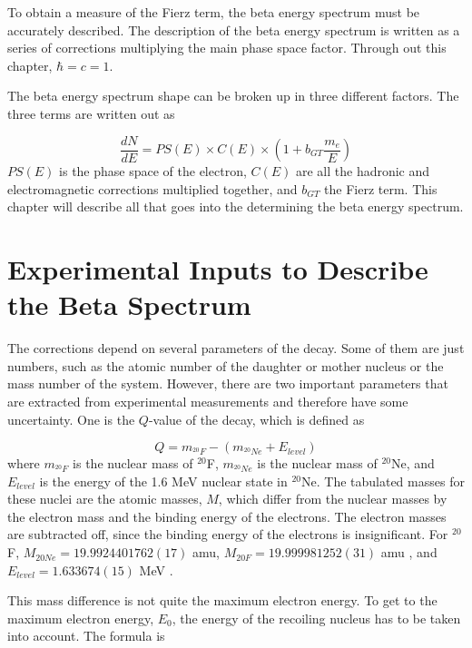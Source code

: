\documentclass[../MaxHughesThesis.tex]{subfiles}
\begin{document}
To obtain a measure of the Fierz term, the beta energy spectrum must be accurately described.
The description of the beta energy spectrum is written as a series of corrections multiplying the main phase space factor.  
Through out this chapter, $\hbar = c = 1$.

The beta energy spectrum shape can be broken up in three different factors. 
The three terms are written out as  %

\begin{equation}
	\frac{dN}{dE} = PS(E) \times C(E) \times (1 + b_{GT}\frac{m_{e}}{E})
	\label{eq:betaspectrum}
\end{equation}
$PS(E)$ is the phase space of the electron, $C(E)$ are all the hadronic and electromagnetic corrections multiplied together, and $b_{GT}$ the Fierz term.
This chapter will describe all that goes into the determining the beta energy spectrum.

\section{Experimental Inputs to Describe the Beta Spectrum}
The corrections depend on several parameters of the decay. 
Some of them are just numbers, such as the atomic number of the daughter or mother nucleus or the mass number of the system.
However, there are two important parameters that are extracted from experimental measurements and therefore have some uncertainty.
One is the $Q$-value of the decay, which is defined as %

\begin{equation}
	Q = m_{^{20}F} - (m_{^{20}Ne} + E_{level})
	\label{eq:qval}
\end{equation} 
where $m_{^{20}F}$ is the nuclear mass of $^{20}$F, $m_{^{20}Ne}$ is the nuclear mass of $^{20}$Ne, and $E_{level}$ is the energy of the 1.6 MeV nuclear state in $^{20}$Ne. 
The tabulated masses for these nuclei are the atomic masses, $M$, which differ from the nuclear masses by the electron mass and the binding energy of the electrons.
The electron masses are subtracted off, since the binding energy of the electrons is insignificant.
For $^{20}$F, $M_{20Ne} = 19.9924401762 (17)$ amu, $M_{20F} = 19.999981252 (31) $ amu \cite{Wan17} , and $E_{level} = 1.633674 (15)$ MeV  \cite{Til98} .

This mass difference is not quite the maximum electron energy. 
To get to the maximum electron energy, $E_{0}$, the energy of the recoiling nucleus has to be taken into account.
The formula is \cite{Hol74}%
\end{document}
